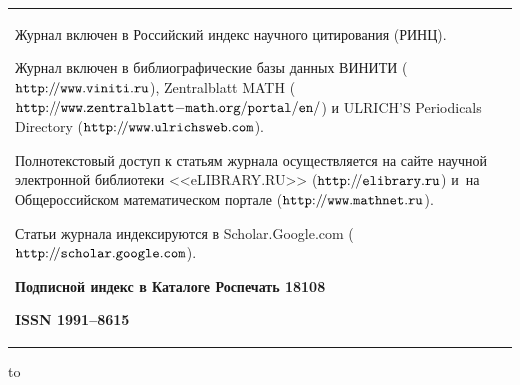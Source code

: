 \begin{table}[h!]
\begin{center}
\begin{tabular}{p{6.5cm}p{6.5cm}}
{Журнал включен в Российский индекс научного цитирования (РИНЦ).

\smallskip

Журнал включен в библиографические базы данных ВИНИТИ ($\tt http{:}{/\!/}www.viniti.ru$),
Zentralblatt MATH ($\tt http{:}{/\!/}www.zentralblatt{-}math.org{/}portal{/}en{/}$) и
ULRICH'S Pe\-ri\-o\-di\-cals Directory ($\tt http{:}{/\!/}www.ulrichsweb.com$).
\smallskip

Полнотекстовый доступ к статьям журнала осуществляется на сайте научной электронной библиотеки <<eLIBRARY.RU>>
($\tt http{:}{/\!/}elibrary.ru$)
и~на Общероссийском математическом портале ($\tt http{:}{/\!/}www.mathnet.ru$).

\smallskip
Статьи журнала индексируются в Scholar.Google.com ($\tt http{:}{/\!/}scholar.google.com$).

\smallskip

\textbf{Подписной индекс в Каталоге Роспечать 18108}
\par \bf
ISSN 1991--8615 }  \\

\end{tabular}
\end{center}
\end{table}


\hbox to 

\vspace{-1cm}

\clearpage

%
